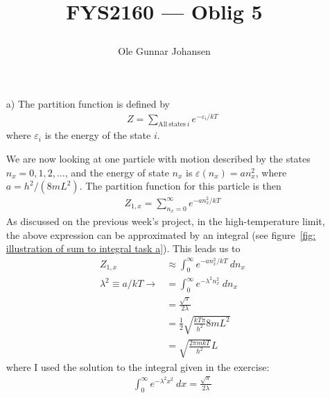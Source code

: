 \documentclass[11pt]{article}
\newcounter{excount}
\newenvironment{exercise}[1][]{\addtocounter{excount}{1} \noindent {\bf Exercise
    \arabic{excount} #1}\hspace{2mm}}{\vspace{4mm}}
\newcommand{\ObligNumber}{5 }
\begin{document}
\title{\begin{huge}FYS2160 ---  Oblig \ObligNumber\end{huge}}
\author{Ole Gunnar Johansen}

\maketitle
\noindent
\begin{exercise}
	\begin{itemize}
		\item[a)]
			The partition function is defined by
			\begin{align*}
				Z = \sum_{\mathrm{All \ states} \ i} e^{-\varepsilon_i/kT}
			\end{align*}
			where $\varepsilon_i$ is the energy of the state $i$.
			
			We are now looking at one particle with motion described by the states $n_x = 0,1,2,...$, and the energy of state $n_x$ is $\varepsilon(n_x) = an_x^2$, where $a=h^2/(8mL^2)$. The partition function for this particle is then
			\begin{align*}
				Z_{1,x} = \sum_{n_x=0}^\infty e^{-an_x^2/kT}
			\end{align*}
			As discussed on the previous week's project, in the high-temperature limit, the above expression can be approximated by an integral (see figure~\ref{fig: illustration of sum to integral task a}). This leads us to
			\begin{align}
				Z_{1,x} 									&\approx \int_{0}^{\infty} e^{-an_x^2/kT} \ dn_x  \nonumber \\
				\lambda^2 \equiv a/kT \rightarrow	&= \int_{0}^{\infty} e^{-\lambda^2n_x^2} \ dn_x \nonumber \\
																&= \frac{\sqrt{\pi}}{2\lambda} \nonumber \\
																&= \frac{1}{2}\sqrt{\frac{kT\pi}{h^2}8mL^2} \nonumber \\
																&= \sqrt{\frac{2\pi mkT}{h^2}}L \label{eq: part.func one part. 1D evaluated}
			\end{align}
			where I used the solution to the integral given in the exercise:
			\begin{align*}
				\int_{0}^{\infty} e^{-\lambda^2x^2} \ dx = \frac{\sqrt{\pi}}{2\lambda}
			\end{align*}
			

\end{itemize}
\end{exercise}
\end{document}
